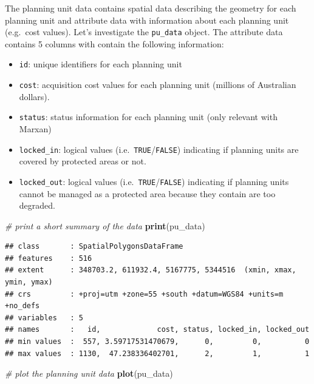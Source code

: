 \documentclass[12pt,]{book}
\newenvironment{Shaded}{\begin{snugshade}}{\end{snugshade}}
\newcommand{\CommentTok}[1]{\textcolor[rgb]{0.56,0.35,0.01}{\textit{#1}}}
\newcommand{\KeywordTok}[1]{\textcolor[rgb]{0.13,0.29,0.53}{\textbf{#1}}}
\newcommand{\NormalTok}[1]{#1}
\providecommand{\tightlist}{%
  \setlength{\itemsep}{0pt}\setlength{\parskip}{0pt}}
\begin{document}
The planning unit data contains spatial data describing the geometry for each planning unit and attribute data with information about each planning unit (e.g.~cost values). Let's investigate the \texttt{pu\_data} object. The attribute data contains 5 columns with contain the following information:

\begin{itemize}
\tightlist
\item
  \texttt{id}: unique identifiers for each planning unit
\item
  \texttt{cost}: acquisition cost values for each planning unit (millions of Australian dollars).
\item
  \texttt{status}: status information for each planning unit (only relevant with Marxan)
\item
  \texttt{locked\_in}: logical values (i.e.~\texttt{TRUE}/\texttt{FALSE}) indicating if planning units are covered by protected areas or not.
\item
  \texttt{locked\_out}: logical values (i.e.~\texttt{TRUE}/\texttt{FALSE}) indicating if planning units cannot be managed as a protected area because they contain are too degraded.
\end{itemize}

\begin{Shaded}
\begin{Highlighting}[]
\CommentTok{# print a short summary of the data}
\KeywordTok{print}\NormalTok{(pu_data)}
\end{Highlighting}
\end{Shaded}

\begin{verbatim}
## class       : SpatialPolygonsDataFrame 
## features    : 516 
## extent      : 348703.2, 611932.4, 5167775, 5344516  (xmin, xmax, ymin, ymax)
## crs         : +proj=utm +zone=55 +south +datum=WGS84 +units=m +no_defs 
## variables   : 5
## names       :   id,             cost, status, locked_in, locked_out 
## min values  :  557, 3.59717531470679,      0,         0,          0 
## max values  : 1130,  47.238336402701,      2,         1,          1
\end{verbatim}

\begin{Shaded}
\begin{Highlighting}[]
\CommentTok{# plot the planning unit data}
\KeywordTok{plot}\NormalTok{(pu_data)}
\end{Highlighting}
\end{Shaded}
\end{document}
